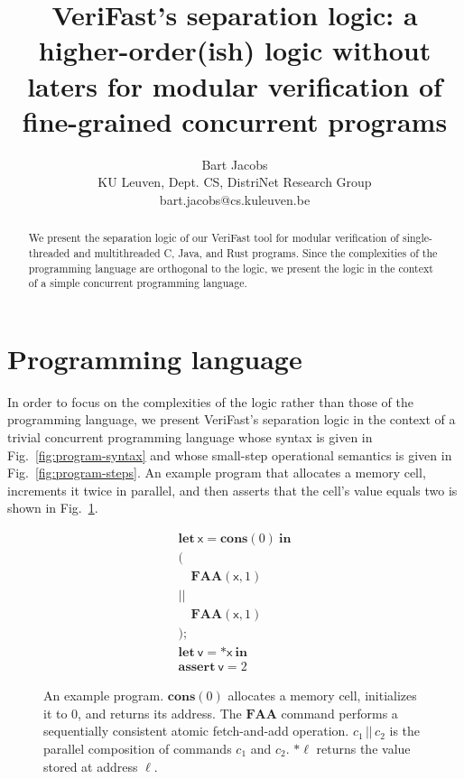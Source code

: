 \documentclass{article}
\title{VeriFast's separation logic: a higher-order(ish) logic without laters for modular verification of fine-grained concurrent programs}
\author{Bart Jacobs\\
{\small KU Leuven, Dept. CS, DistriNet Research Group}\\
{\small \textsf{bart.jacobs@cs.kuleuven.be}}}
\begin{document}
\maketitle

\begin{abstract}
We present the separation logic of our VeriFast tool for modular verification of single-threaded and multithreaded C, Java, and Rust programs. Since the complexities of the programming language are orthogonal to the logic, we present the logic in the context of a simple concurrent programming language.
\end{abstract}

\section{Programming language}

In order to focus on the complexities of the logic rather than those of the programming language, we present VeriFast's separation logic in the context of a trivial concurrent programming language whose syntax is given in Fig.~\ref{fig:program-syntax} and whose small-step operational semantics is given in Fig.~\ref{fig:program-steps}. An example program that allocates a memory cell, increments it twice in parallel, and then asserts that the cell's value equals two is shown in Fig.~\ref{fig:example}.

\begin{figure}
$$\begin{array}{l}
\mathbf{let}\ \mathsf{x} = \mathbf{cons}(0)\ \mathbf{in}\\
(\\
\quad \mathbf{FAA}(\mathsf{x}, 1)\\
||\\
\quad \mathbf{FAA}(\mathsf{x}, 1)\\
);\\
\mathbf{let}\ \mathsf{v} = {*}\mathsf{x}\ \mathbf{in}\\
\mathbf{assert}\ \mathsf{v} = 2
\end{array}$$
\caption{An example program. $\mathbf{cons}(0)$ allocates a memory cell, initializes it to 0, and returns its address. The $\mathbf{FAA}$ command performs a sequentially consistent atomic fetch-and-add operation. $c_1\,||\, c_2$ is the parallel composition of commands $c_1$ and $c_2$. $*\ell$ returns the value stored at address $\ell$.}\label{fig:example}
\end{figure}
\end{document}

